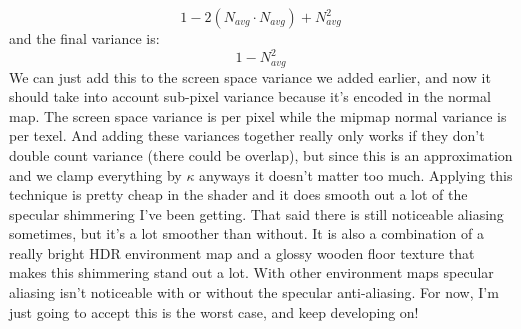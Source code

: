 \documentclass{article}
\begin{document}
\[1 - 2(N_{avg} \cdot N_{avg}) + N_{avg}^2\]
and the final variance is:
\[1 - N_{avg}^2\]
We can just add this to the screen space variance we added earlier, and now it should take into account sub-pixel variance because it's encoded in the normal map. The screen space variance is per pixel while the mipmap normal variance is per texel. And adding these variances together really only works if they don't double count variance (there could be overlap), but since this is an approximation and we clamp everything by \(\kappa\) anyways it doesn't matter too much. Applying this technique is pretty cheap in the shader and it does smooth out a lot of the specular shimmering I've been getting. That said there is still noticeable aliasing sometimes, but it's a lot smoother than without. It is also a combination of a really bright HDR environment map and a glossy wooden floor texture that makes this shimmering stand out a lot. With other environment maps specular aliasing isn't noticeable with or without the specular anti-aliasing. For now, I'm just going to accept this is the worst case, and keep developing on! 
\end{document}
